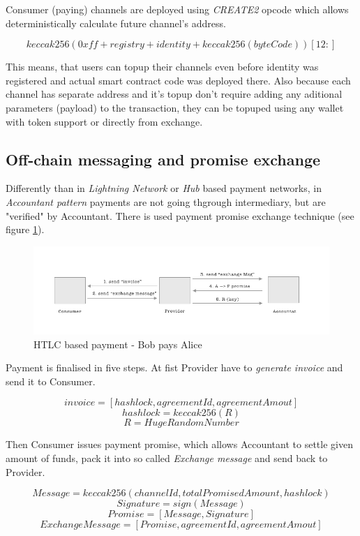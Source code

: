 \documentclass[a4paper,12pt]{article}
\begin{document}
Consumer (paying) channels are deployed using \textit{CREATE2} opcode \cite{create2} 
which allows deterministically calculate future channel's address.

\[ keccak256(0xff + registry + identity + keccak256(byteCode))[12:]\]

This means, that users can topup their channels even before identity was 
registered and actual smart contract code was deployed there. Also because each
channel has separate address and it's topup don't require adding any aditional 
parameters (payload) to the transaction, they can be topuped using any wallet 
with token support or directly from exchange.

\subsection{Off-chain messaging and promise exchange}

Differently than in \textit{Lightning Network} or \textit{Hub} based payment 
networks, in \textit{Accountant pattern} payments are not going thgrough 
intermediary, but are "verified" by Accountant. There is used payment promise 
exchange technique (see figure \ref{img:off-chain-interactions}).

\begin{figure}[H]
    \centering
    \includegraphics[scale=0.5]{img/off-chain-interactions}
    \caption{HTLC based payment - Bob pays Alice}
    \label{img:off-chain-interactions}
\end{figure}

Payment is finalised in five steps. At fist Provider have to \textit{generate 
invoice} and send it to Consumer.

\[ invoice = [hashlock, agreementId, agreementAmout] \]
\[ hashlock = keccak256(R) \]
\[ R = HugeRandomNumber \]

Then Consumer issues payment promise, which allows Accountant to settle given 
amount of funds, pack it into so called \textit{Exchange message} and send back 
to Provider. 

\[ Message = keccak256(channelId, totalPromisedAmount, hashlock) \]
\[ Signature = sign(Message) \]
\[ Promise = [Message, Signature]\]
\[ ExchangeMessage = [Promise, agreementId, agreementAmout] \]
\end{document}
